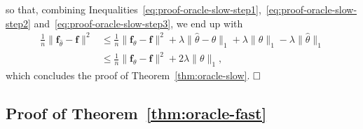 \documentclass[
	fontsize=11pt, %
	twoside=false, %
	numbers=noenddot, %
]{kaobook}
\renewcommand{\bf}{{\boldsymbol f}}
\newcommand{\wh}{\widehat}
\newcommand{\norm}[1]{\| #1 \|}
\begin{document}
so that, combining Inequalities~\eqref{eq:proof-oracle-slow-step1},~\eqref{eq:proof-oracle-slow-step2} and~\eqref{eq:proof-oracle-slow-step3}, we end up with
\begin{align*}
	\frac 1n \norm{\bf_{\wh \theta} - \bf}^2 &
	\leq \frac 1n \norm{\bf_\theta - \bf}^2 
	+ \lambda \norm{\wh \theta - \theta}_1 
	+ \lambda \norm{\theta}_1 
	- \lambda \norm{\wh \theta}_1 \\
	&\leq \frac 1n \norm{\bf_\theta - \bf}^2 + 2 \lambda \norm{\theta}_1,
\end{align*}
which concludes the proof of Theorem~\ref{thm:oracle-slow}. $\hfill \square$


\subsection{Proof of Theorem~\ref{thm:oracle-fast}} %
\label{sub:proof_of_theorem_thm:oracle-fast}

\end{document}
